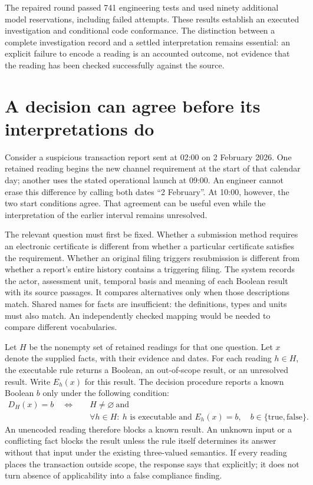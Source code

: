 \documentclass[12pt,a4paper,oneside,openany]{book}
\begin{document}
The repaired round passed 741 engineering tests and used ninety additional
model reservations, including failed attempts. These results establish an
executed investigation and conditional code conformance. The distinction between
a complete investigation record and a settled interpretation remains essential:
an explicit failure to encode a reading is an accounted outcome, not evidence
that the reading has been checked successfully against the source.


\section{A decision can agree before its interpretations do}
\label{sec:invariant-decisions}

Consider a suspicious transaction report sent at 02:00 on 2 February 2026.
One retained reading begins the new channel requirement at the start of that
calendar day; another uses the stated operational launch at 09:00. An engineer
cannot erase this difference by calling both dates ``2 February''. At 10:00,
however, the two start conditions agree. That agreement can be useful even
while the interpretation of the earlier interval remains unresolved.
\cite{sfcstr2026}

The relevant question must first be fixed. Whether a submission method requires
an electronic certificate is different from whether a particular certificate
satisfies the requirement. Whether an original filing triggers resubmission is
different from whether a report's entire history contains a triggering filing.
The system records the actor, assessment unit, temporal basis and meaning of
each Boolean result with its source passages. It compares alternatives only
when those descriptions match. Shared names for facts are insufficient: the
definitions, types and units must also match. An independently checked mapping
would be needed to compare different vocabularies.

Let $H$ be the nonempty set of retained readings for that one question. Let $x$
denote the supplied facts, with their evidence and dates. For each reading
$h\in H$, the executable rule returns a Boolean, an out-of-scope result, or an
unresolved result. Write $E_h(x)$ for this result. The decision procedure reports
a known Boolean $b$ only under the following condition:
\begin{equation}
  \begin{split}
    D_H(x)=b \quad\Longleftrightarrow\quad &H\ne\varnothing\ \text{and}\\
    &\forall h\in H:\ h\text{ is executable and }E_h(x)=b,
    \quad b\in\{\mathrm{true},\mathrm{false}\}.
  \end{split}
  \label{eq:retained-unanimity}
\end{equation}
An unencoded reading therefore blocks a known result. An unknown input or a
conflicting fact blocks the result unless the rule itself determines its answer
without that input under the existing three-valued semantics. If every reading
places the transaction outside scope, the response says that explicitly; it
does not turn absence of applicability into a false compliance finding.
\end{document}
